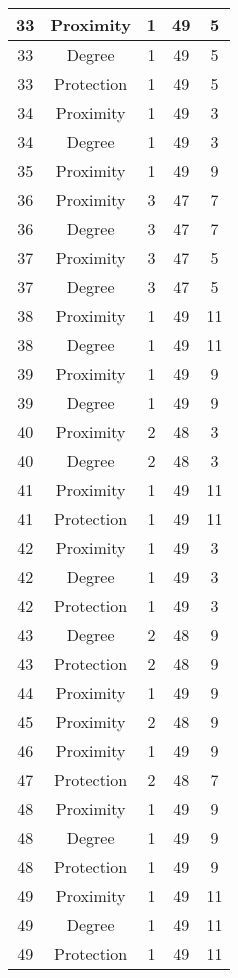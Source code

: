 \documentclass[results.tex]{subfiles}
\begin{document}
\begin{center}
\begin{tabular}{| c || c | c | c | c |}
    \hline
    33 & Proximity & 1 & 49 & 5 \\ 
    \hline
    33 & Degree & 1 & 49 & 5 \\ 
    \hline
    33 & Protection & 1 & 49 & 5 \\ 
    \hline
    34 & Proximity & 1 & 49 & 3 \\ 
    \hline
    34 & Degree & 1 & 49 & 3 \\ 
    \hline
    35 & Proximity & 1 & 49 & 9 \\ 
    \hline
    36 & Proximity & 3 & 47 & 7 \\ 
    \hline
    36 & Degree & 3 & 47 & 7 \\ 
    \hline
    37 & Proximity & 3 & 47 & 5 \\ 
    \hline
    37 & Degree & 3 & 47 & 5 \\ 
    \hline
    38 & Proximity & 1 & 49 & 11 \\ 
    \hline
    38 & Degree & 1 & 49 & 11 \\ 
    \hline
    39 & Proximity & 1 & 49 & 9 \\ 
    \hline
    39 & Degree & 1 & 49 & 9 \\ 
    \hline
    40 & Proximity & 2 & 48 & 3 \\ 
    \hline
    40 & Degree & 2 & 48 & 3 \\ 
    \hline
    41 & Proximity & 1 & 49 & 11 \\ 
    \hline
    41 & Protection & 1 & 49 & 11 \\ 
    \hline
    42 & Proximity & 1 & 49 & 3 \\ 
    \hline
    42 & Degree & 1 & 49 & 3 \\ 
    \hline
    42 & Protection & 1 & 49 & 3 \\ 
    \hline
    43 & Degree & 2 & 48 & 9 \\ 
    \hline
    43 & Protection & 2 & 48 & 9 \\ 
    \hline
    44 & Proximity & 1 & 49 & 9 \\ 
    \hline
    45 & Proximity & 2 & 48 & 9 \\ 
    \hline
    46 & Proximity & 1 & 49 & 9 \\ 
    \hline
    47 & Protection & 2 & 48 & 7 \\ 
    \hline
    48 & Proximity & 1 & 49 & 9 \\ 
    \hline
    48 & Degree & 1 & 49 & 9 \\ 
    \hline
    48 & Protection & 1 & 49 & 9 \\ 
    \hline
    49 & Proximity & 1 & 49 & 11 \\ 
    \hline
    49 & Degree & 1 & 49 & 11 \\ 
    \hline
    49 & Protection & 1 & 49 & 11 \\ 
    \hline   \end{tabular}
\end{center}
\end{document}
